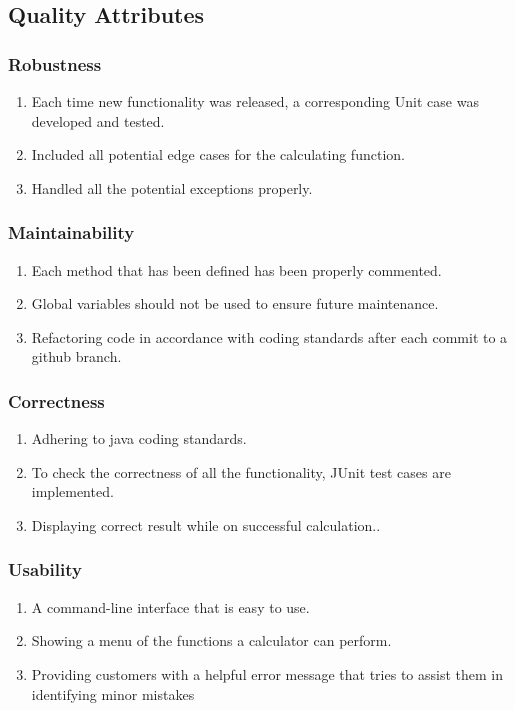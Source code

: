 \documentclass[a4paper,12pt]{report}
\begin{document}
\pagebreak

\subsection{Quality Attributes}
\subsubsection{Robustness}
\begin{enumerate}
   \item Each time new functionality was released, a corresponding Unit case was developed and tested.
   \item Included all potential edge cases for the calculating function.
   \item Handled all the potential exceptions properly.
\end{enumerate}
\subsubsection{Maintainability}
\begin{enumerate}
   \item Each method that has been defined has been properly commented.
   \item Global variables should not be used to ensure future maintenance.
   \item Refactoring code in accordance with coding standards after each commit to a github branch.
\end{enumerate}
\subsubsection{Correctness}
\begin{enumerate}
   \item Adhering to java coding standards.
   \item To check the correctness of all the functionality, JUnit test cases are implemented.
   \item Displaying correct result while on successful calculation..
\end{enumerate}
\subsubsection{Usability}
\begin{enumerate}
   \item A command-line interface that is easy to use.
    \item Showing a menu of the functions a calculator can perform.
    \item Providing customers with a helpful error message that tries to assist them in identifying minor mistakes

\end{enumerate}
\end{document}
